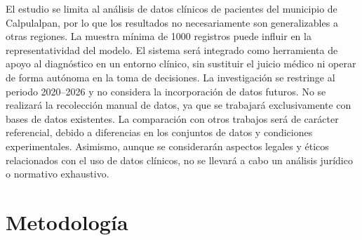 El estudio se limita al an\'alisis de datos cl\'inicos de pacientes del municipio de Calpulalpan, por lo que los resultados no necesariamente son generalizables a otras regiones. La muestra m\'inima de 1000 registros puede influir en la representatividad del modelo. El sistema ser\'a integrado como herramienta de apoyo al diagn\'ostico en un entorno cl\'inico, sin sustituir el juicio m\'edico ni operar de forma aut\'onoma en la toma de decisiones. La investigaci\'on se restringe al periodo 2020--2026 y no considera la incorporaci\'on de datos futuros. No se realizar\'a la recolecci\'on manual de datos, ya que se trabajar\'a exclusivamente con bases de datos existentes. La comparaci\'on con otros trabajos ser\'a de car\'acter referencial, debido a diferencias en los conjuntos de datos y condiciones experimentales. Asimismo, aunque se considerar\'an aspectos legales y \'eticos relacionados con el uso de datos cl\'inicos, no se llevar\'a a cabo un an\'alisis jur\'idico o normativo exhaustivo.


\section{Metodolog\'ia}

